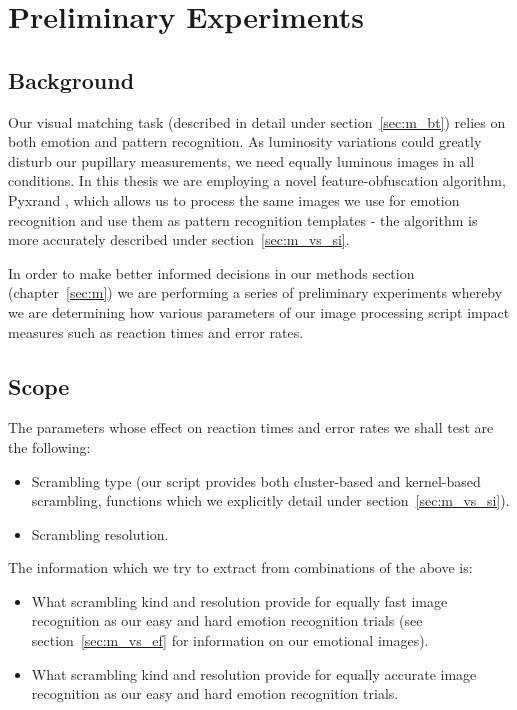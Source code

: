 \chapter{Preliminary Experiments}\label{sec:pe}
    \section{Background}\label{sec:pa_s}
	Our visual matching task (described in detail under section~\ref{sec:m_bt}) relies on both emotion and pattern recognition.
	As luminosity variations could greatly disturb our pupillary measurements, we need equally luminous images in all conditions.
	In this thesis we are employing a novel feature-obfuscation algorithm, Pyxrand \citep{pyxrand}, which allows us to process the same images we use for emotion recognition and use them as pattern recognition templates - the algorithm is more accurately described under section~\ref{sec:m_vs_si}.
	
	In order to make better informed decisions in our methods section (chapter~\ref{sec:m}) we are performing a series of preliminary experiments whereby we are determining how various parameters of our image processing script impact measures such as reaction times and error rates.
    \section{Scope}
	The parameters whose effect on reaction times and error rates we shall test are the following:
	\begin{itemize}
	    \item Scrambling type (our script provides both cluster-based and kernel-based scrambling, functions which we explicitly detail under section~\ref{sec:m_vs_si}).
	    \item Scrambling resolution.
	\end{itemize}
	The information which we try to extract from combinations of the above is:
	\begin{itemize}
	    \item What scrambling kind and resolution provide for equally fast image recognition as our easy and hard emotion recognition trials (see section~\ref{sec:m_vs_ef} for information on our emotional images).
	    \item What scrambling kind and resolution provide for equally accurate image recognition as our easy and hard emotion recognition trials.
	\end{itemize}

